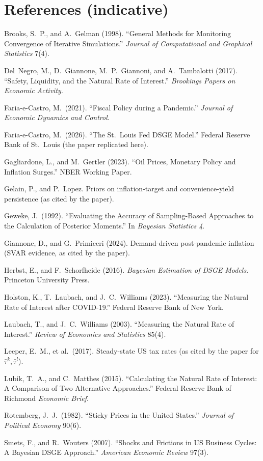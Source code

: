 \documentclass[11pt]{article}
\theoremstyle{definition}
\begin{document}
\section*{References (indicative)}\label{sec:refs}
\begin{footnotesize}
\begin{list}{}{\setlength{\itemindent}{-\leftmargin}\setlength{\itemsep}{2pt}}
\item Brooks, S.\ P., and A.\ Gelman (1998). ``General Methods for Monitoring Convergence of Iterative
Simulations.'' \emph{Journal of Computational and Graphical Statistics} 7(4).
\item Del~Negro, M., D.\ Giannone, M.\ P.\ Giannoni, and A.\ Tambalotti (2017). ``Safety, Liquidity, and
the Natural Rate of Interest.'' \emph{Brookings Papers on Economic Activity}.
\item Faria-e-Castro, M.\ (2021). ``Fiscal Policy during a Pandemic.'' \emph{Journal of Economic
Dynamics and Control}.
\item Faria-e-Castro, M.\ (2026). ``The St.\ Louis Fed DSGE Model.'' Federal Reserve Bank of St.\ Louis
(the paper replicated here).
\item Gagliardone, L., and M.\ Gertler (2023). ``Oil Prices, Monetary Policy and Inflation Surges.''
NBER Working Paper.
\item Gelain, P., and P.\ Lopez. Priors on inflation-target and convenience-yield persistence (as cited
by the paper).
\item Geweke, J.\ (1992). ``Evaluating the Accuracy of Sampling-Based Approaches to the Calculation of
Posterior Moments.'' In \emph{Bayesian Statistics 4}.
\item Giannone, D., and G.\ Primiceri (2024). Demand-driven post-pandemic inflation (SVAR evidence, as
cited by the paper).
\item Herbst, E., and F.\ Schorfheide (2016). \emph{Bayesian Estimation of DSGE Models}. Princeton
University Press.
\item Holston, K., T.\ Laubach, and J.\ C.\ Williams (2023). ``Measuring the Natural Rate of Interest
after COVID-19.'' Federal Reserve Bank of New York.
\item Laubach, T., and J.\ C.\ Williams (2003). ``Measuring the Natural Rate of Interest.'' \emph{Review
of Economics and Statistics} 85(4).
\item Leeper, E.\ M., et al.\ (2017). Steady-state US tax rates (as cited by the paper for
$\bar\tau^k,\bar\tau^l$).
\item Lubik, T.\ A., and C.\ Matthes (2015). ``Calculating the Natural Rate of Interest: A Comparison of
Two Alternative Approaches.'' Federal Reserve Bank of Richmond \emph{Economic Brief}.
\item Rotemberg, J.\ J.\ (1982). ``Sticky Prices in the United States.'' \emph{Journal of Political
Economy} 90(6).
\item Smets, F., and R.\ Wouters (2007). ``Shocks and Frictions in US Business Cycles: A Bayesian DSGE
Approach.'' \emph{American Economic Review} 97(3).
\end{list}
\end{footnotesize}
\end{document}
